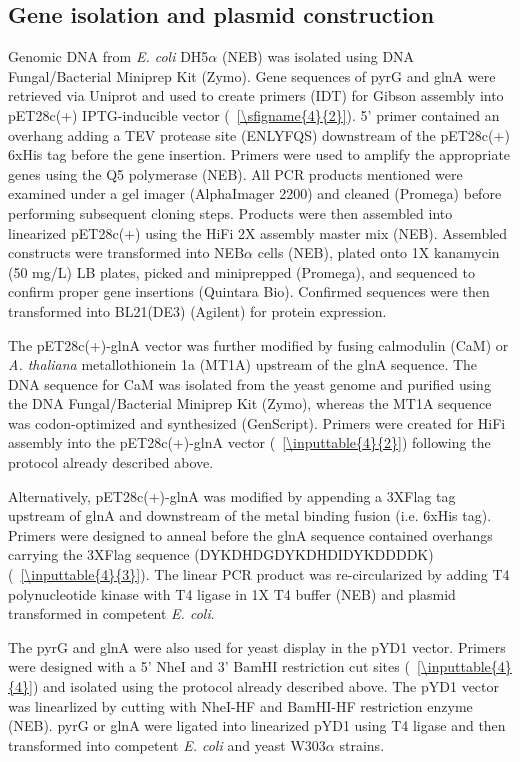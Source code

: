 \documentclass[../main/main]{subfiles}
\begin{document}
\subsection*{Gene isolation and plasmid construction}
Genomic DNA from \textit{E. coli} DH5$\alpha$ (NEB) was isolated using DNA Fungal/Bacterial Miniprep Kit (Zymo). Gene sequences of pyrG and glnA were retrieved via Uniprot and used to create primers (IDT) for Gibson assembly into pET28c(+) IPTG-inducible vector (\sFIGURE~\ref{\sfigname{4}{2}}). 5' primer contained an overhang adding a TEV protease site (ENLYFQS) downstream of the pET28c(+) 6xHis tag before the gene insertion. Primers were used to amplify the appropriate genes using the Q5 polymerase (NEB). All PCR products mentioned were examined under a gel imager (AlphaImager 2200) and cleaned (Promega) before performing subsequent cloning steps. Products were then assembled into linearized pET28c(+) using the HiFi 2X assembly master mix (NEB). Assembled constructs were transformed into NEB$\alpha$ cells (NEB), plated onto 1X kanamycin (50 mg/L) LB plates, picked and miniprepped (Promega), and sequenced to confirm proper gene insertions (Quintara Bio). Confirmed sequences were then transformed into BL21(DE3) (Agilent) for protein expression.

The pET28c(+)-glnA vector was further modified by fusing calmodulin (CaM) or \textit{A. thaliana} metallothionein 1a (MT1A) upstream of the glnA sequence. The DNA sequence for CaM was isolated from the yeast genome and purified using the DNA Fungal/Bacterial Miniprep Kit (Zymo), whereas the MT1A sequence was codon-optimized and synthesized (GenScript). Primers were created for HiFi assembly into the pET28c(+)-glnA vector (\sTABLE~\ref{\inputtable{4}{2}}) following the protocol already described above.

Alternatively, pET28c(+)-glnA was modified by appending a 3XFlag tag upstream of glnA and downstream of the metal binding fusion (i.e. 6xHis tag). Primers were designed to anneal before the glnA sequence contained overhangs carrying the 3XFlag sequence (DYKDHDGDYKDHDIDYKDDDDK) (\sTABLE~\ref{\inputtable{4}{3}}). The linear PCR product was re-circularized by adding T4 polynucleotide kinase with T4 ligase in 1X T4 buffer (NEB) and plasmid transformed in competent \textit{E. coli}.

The pyrG and glnA were also used for yeast display in the pYD1 vector. Primers were designed with a 5' NheI and 3' BamHI restriction cut sites (\sTABLE~\ref{\inputtable{4}{4}}) and isolated using the protocol already described above. The pYD1 vector was linearlized by cutting with NheI-HF and BamHI-HF restriction enzyme (NEB). pyrG or glnA were ligated into linearized pYD1 using T4 ligase and then transformed into competent \textit{E. coli} and yeast W303$\alpha$ strains.
\end{document}
